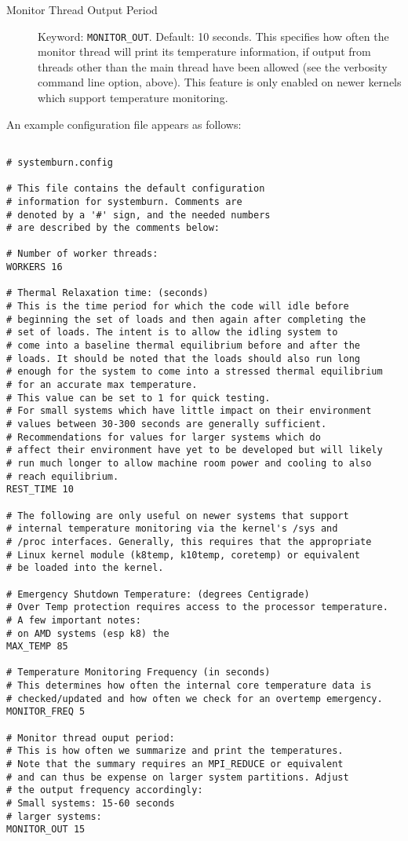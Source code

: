 \begin{description}
	\item[Monitor Thread Output Period] Keyword:
	\verb!MONITOR_OUT!. Default: 10 seconds. This specifies how
	often the monitor thread will print its temperature information,
	if output from threads other than the main thread have been
	allowed (see the verbosity command line option, above).
	This feature is only enabled on newer kernels which support
	temperature monitoring.

\end{description}

An example configuration file appears as follows: 

\begin{verbatim}

# systemburn.config

# This file contains the default configuration
# information for systemburn. Comments are
# denoted by a '#' sign, and the needed numbers
# are described by the comments below:

# Number of worker threads:
WORKERS 16

# Thermal Relaxation time: (seconds)
# This is the time period for which the code will idle before
# beginning the set of loads and then again after completing the
# set of loads. The intent is to allow the idling system to 
# come into a baseline thermal equilibrium before and after the 
# loads. It should be noted that the loads should also run long
# enough for the system to come into a stressed thermal equilibrium
# for an accurate max temperature.
# This value can be set to 1 for quick testing.
# For small systems which have little impact on their environment
# values between 30-300 seconds are generally sufficient.
# Recommendations for values for larger systems which do
# affect their environment have yet to be developed but will likely
# run much longer to allow machine room power and cooling to also
# reach equilibrium.
REST_TIME 10

# The following are only useful on newer systems that support
# internal temperature monitoring via the kernel's /sys and
# /proc interfaces. Generally, this requires that the appropriate
# Linux kernel module (k8temp, k10temp, coretemp) or equivalent
# be loaded into the kernel.

# Emergency Shutdown Temperature: (degrees Centigrade)
# Over Temp protection requires access to the processor temperature.
# A few important notes:
# on AMD systems (esp k8) the 
MAX_TEMP 85

# Temperature Monitoring Frequency (in seconds)
# This determines how often the internal core temperature data is
# checked/updated and how often we check for an overtemp emergency.
MONITOR_FREQ 5

# Monitor thread ouput period:
# This is how often we summarize and print the temperatures.
# Note that the summary requires an MPI_REDUCE or equivalent
# and can thus be expense on larger system partitions. Adjust
# the output frequency accordingly:
# Small systems: 15-60 seconds
# larger systems: 
MONITOR_OUT 15

\end{verbatim}
